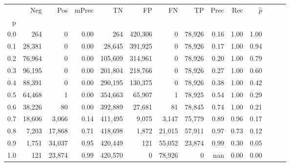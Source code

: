 \begin{tabular}{rrrrrrrrrrrrrr}
\toprule
{} &     Neg &     Pos & mPrec &       TN &       FP &      FN &      TP &  Prec &   Rec & $\hat{p}$ \\
p   &         &         &       &          &          &         &         &       &       &           \\
\midrule
0.0 &     264 &       0 &  0.00 &      264 &  420,306 &       0 &  78,926 &  0.16 &  1.00 &      1.00 \\
0.1 &  28,381 &       0 &  0.00 &   28,645 &  391,925 &       0 &  78,926 &  0.17 &  1.00 &      0.94 \\
0.2 &  76,964 &       0 &  0.00 &  105,609 &  314,961 &       0 &  78,926 &  0.20 &  1.00 &      0.79 \\
0.3 &  96,195 &       0 &  0.00 &  201,804 &  218,766 &       0 &  78,926 &  0.27 &  1.00 &      0.60 \\
0.4 &  88,391 &       0 &  0.00 &  290,195 &  130,375 &       0 &  78,926 &  0.38 &  1.00 &      0.42 \\
0.5 &  64,468 &       1 &  0.00 &  354,663 &   65,907 &       1 &  78,925 &  0.54 &  1.00 &      0.29 \\
0.6 &  38,226 &      80 &  0.00 &  392,889 &   27,681 &      81 &  78,845 &  0.74 &  1.00 &      0.21 \\
0.7 &  18,606 &   3,066 &  0.14 &  411,495 &    9,075 &   3,147 &  75,779 &  0.89 &  0.96 &      0.17 \\
0.8 &   7,203 &  17,868 &  0.71 &  418,698 &    1,872 &  21,015 &  57,911 &  0.97 &  0.73 &      0.12 \\
0.9 &   1,751 &  34,037 &  0.95 &  420,449 &      121 &  55,052 &  23,874 &  0.99 &  0.30 &      0.05 \\
1.0 &     121 &  23,874 &  0.99 &  420,570 &        0 &  78,926 &       0 &   nan &  0.00 &      0.00 \\
\bottomrule
\end{tabular}
